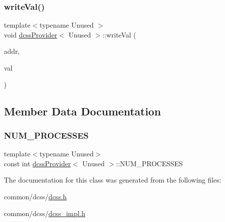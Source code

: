 \mbox{\label{classdcssProvider_ae9507935cbccf56456224e116053de48}} 
\subsubsection{\texorpdfstring{write\+Val()}{writeVal()}}
{\footnotesize\ttfamily template$<$typename Unused $>$ \\
void \hyperlink{classdcssProvider}{dcss\+Provider}$<$ Unused $>$\+::write\+Val (\begin{DoxyParamCaption}\item[{\hyperlink{rq__unsafe_8h_ad45142aaf2ff20a036dc6242b8483e9c}{casword\+\_\+t} volatile $\ast$}]{addr,  }\item[{\hyperlink{rq__unsafe_8h_ad45142aaf2ff20a036dc6242b8483e9c}{casword\+\_\+t}}]{val }\end{DoxyParamCaption})}



\subsection{Member Data Documentation}
\mbox{\label{classdcssProvider_a54b21326a5b1a803abf3f60d35a62c37}} 
\subsubsection{\texorpdfstring{N\+U\+M\+\_\+\+P\+R\+O\+C\+E\+S\+S\+ES}{NUM\_PROCESSES}}
{\footnotesize\ttfamily template$<$typename Unused$>$ \\
const int \hyperlink{classdcssProvider}{dcss\+Provider}$<$ Unused $>$\+::N\+U\+M\+\_\+\+P\+R\+O\+C\+E\+S\+S\+ES}



The documentation for this class was generated from the following files\+:\begin{DoxyCompactItemize}
\item 
common/dcss/\hyperlink{dcss_8h}{dcss.\+h}\item 
common/dcss/\hyperlink{dcss__impl_8h}{dcss\+\_\+impl.\+h}\end{DoxyCompactItemize}
